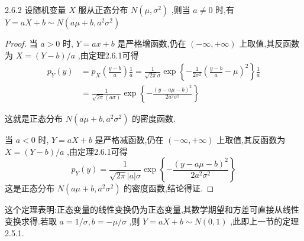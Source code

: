 \begin{theorem}{}{2.6.2}
	设随机变量 $ X $ 服从正态分布 $ N\left(\mu, \sigma^{2}\right) $ ,则当 $ a \neq 0 $ 时,有 $ Y= aX+b \sim N\left(a \mu+b, a^{2} \sigma^{2}\right) $ 
\end{theorem}

\begin{proof}
	当 $ a>0 $ 时, $ Y=ax+b $ 是严格增函数,仍在 $ (-\infty,+\infty) $ 上取值,其反函数为 $ X=(Y-b)/a $ ,由定理2.6.1可得
	\[
	\begin{aligned} 
	p_{Y}(y) &=p_{X}\left(\frac{y-b}{a}\right) \frac{1}{a}=\frac{1}{\sqrt{2 \pi} \sigma} \exp \left\{-\frac{1}{2 \sigma^{2}}\left(\frac{y-b}{a}-\mu\right)^{2}\right\} \frac{1}{a} \\ 
	&=\frac{1}{\sqrt{2 \pi}(a \sigma)} \exp \left\{-\frac{(y-a \mu-b)^{2}}{2 a^{2} \sigma^{2}}\right\} 
	\end{aligned}
	\]
	
	这就是正态分布 $ N\left(a \mu+b, a^{2} \sigma^{2}\right) $ 的密度函数.
	
	当 $ a<0 $ 时, $ Y=aX+b $ 是严格减函数,仍在 $ (-\infty,+\infty) $ 上取值,其反函数为 $ X=(Y-b)/a $ ,由定理2.6.1可得
	\[
	p_{Y}(y)=\frac{1}{\sqrt{2 \pi}|a| \sigma} \exp \left\{-\frac{(y-a \mu-b)^{2}}{2 a^{2} \sigma^{2}}\right\}
	\]
    这是正态分布 $ N\left(a \mu+b, a^{2} \sigma^{2}\right) $ 的密度函数,结论得证.
	
\end{proof}

这个定理表明:正态变量的线性变换仍为正态变量,其数学期望和方差可直接从线性变换求得.若取 $ a=1 / \sigma, b=-\mu / \sigma $ ,则 $ Y=a X+b \sim N(0,1) $ ,此即上一节的定理2.5.1.

